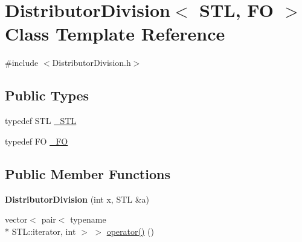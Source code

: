 \hypertarget{class_distributor_division}{\section{Distributor\-Division$<$ S\-T\-L, F\-O $>$ Class Template Reference}
\label{class_distributor_division}
}


{\ttfamily \#include $<$Distributor\-Division.\-h$>$}

\subsection*{Public Types}
\begin{DoxyCompactItemize}
\item 
typedef S\-T\-L \hyperlink{class_distributor_division_ae97a4cdf404cf245e757bb47bda3ee3e}{\-\_\-\-S\-T\-L}
\item 
typedef F\-O \hyperlink{class_distributor_division_a9c9edc89218167c39a3aa0e797ad22c5}{\-\_\-\-F\-O}
\end{DoxyCompactItemize}
\subsection*{Public Member Functions}
\begin{DoxyCompactItemize}
\item 
\hypertarget{class_distributor_division_a326603e72a0c3a5df36c1ddd5a5434d2}{{\bfseries Distributor\-Division} (int x, S\-T\-L \&a)}\label{class_distributor_division_a326603e72a0c3a5df36c1ddd5a5434d2}

\item 
vector$<$ pair$<$ typename \\*
S\-T\-L\-::iterator, int $>$ $>$ \hyperlink{class_distributor_division_ab3b16a94bd01c77e3697e82a293a787f}{operator()} ()
\end{DoxyCompactItemize}
